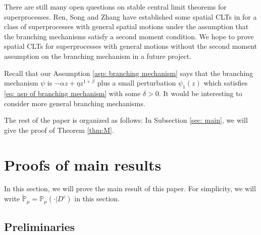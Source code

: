 \documentclass[12pt,a4paper]{amsart}
\theoremstyle{plain}
\newtheorem{thm}{Theorem}[section]
\theoremstyle{definition}
\numberwithin{equation}{section}
\begin{document}
There are still many open questions on stable central limit theorems for superprocesses.
Ren, Song and Zhang have established some spatial  CLTs in \cite{RenSongZhang2015Central} for a class of superprocesses with general spatial motions under
the assumption that the branching mechanisms satisfy a second moment condition.
We hope to prove spatial CLTs for superprocesses with general motions without the second moment assumption on the branching mechanism in a future project.

Recall that our Assumption \ref{asp: branching mechanism} says that the branching mechanism $\psi$ is $-\alpha z +\eta z^{1+\beta}$ plus a small perturbation
$\psi_1(z)$
which satisfies \eqref{eq: asp of branching mechanism} with some $\delta>0$.
It would be interesting to consider more general branching mechanisms.


The rest of the paper is organized as follows:
In Subsection \ref{sec: main},
we will give the proof of Theorem \ref{thm:M}.


\section{Proofs of main results}
\label{proofs of main results}
In this section, we will prove the main result of this paper.
For simplicity, we will write $\mathbb{\widetilde{P}}_{\mu}=\mathbb{P}_{\mu}(\cdot|D^c)$ in this section.



\subsection{Preliminaries}
\end{document}
